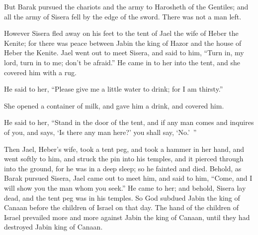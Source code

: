 {But Barak pursued the chariots and the army to Harosheth of the Gentiles; and all the army of Sisera fell by the edge of the sword. There was not a man left.
\par }{\PP {}However Sisera fled away on his feet to the tent of Jael the wife of Heber the Kenite; for there was peace between Jabin the king of Hazor and the house of Heber the Kenite.
Jael went out to meet Sisera, and said to him, “Turn in, my lord, turn in to me; don’t be afraid.” He came in to her into the tent, and she covered him with a rug.
\par }{\PP {}He said to her, “Please give me a little water to drink; for I am thirsty.”
\par }{\PP She opened a container of milk, and gave him a drink, and covered him.
\par }{\PP {}He said to her, “Stand in the door of the tent, and if any man comes and inquires of you, and says, ‘Is there any man here?’ you shall say, ‘No.’ ”
\par }{\PP {}Then Jael, Heber’s wife, took a tent peg, and took a hammer in her hand, and went softly to him, and struck the pin into his temples, and it pierced through into the ground, for he was in a deep sleep; so he fainted and died.
Behold, as Barak pursued Sisera, Jael came out to meet him, and said to him, “Come, and I will show you the man whom you seek.” He came to her; and behold, Sisera lay dead, and the tent peg was in his temples.
So God subdued Jabin the king of Canaan before the children of Israel on that day.
The hand of the children of Israel prevailed more and more against Jabin the king of Canaan, until they had destroyed Jabin king of Canaan.

}
